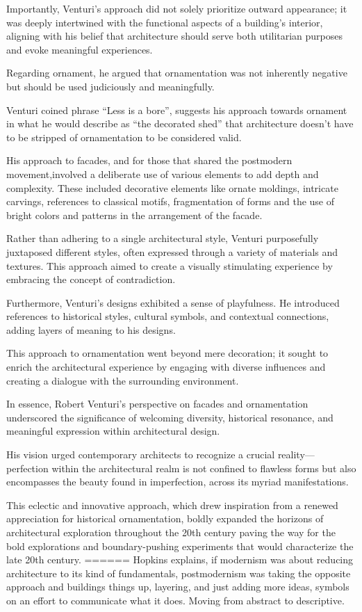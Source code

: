 Importantly, Venturi's approach did not solely prioritize outward appearance;
it was deeply intertwined with the functional aspects of a building's interior, aligning with his belief that architecture should serve both utilitarian purposes and evoke meaningful experiences.

Regarding ornament, he argued that ornamentation was not inherently negative but should be used judiciously and meaningfully.

Venturi coined phrase ``Less is a bore'', suggests his approach towards ornament in what he would describe as ``the decorated shed''\cite{Venturi1972} that architecture doesn't have to be stripped of ornamentation to be considered valid.

His approach to facades, and for those that shared the postmodern movement,involved a deliberate use of various elements to add depth and complexity.
These included decorative elements like ornate moldings, intricate carvings, references to classical motifs, fragmentation of forms and the use of bright colors and patterns in the arrangement of the facade\cite{McLaughlin2023}.

Rather than adhering to a single architectural style, Venturi purposefully juxtaposed different styles, often expressed through a variety of materials and textures.
This approach aimed to create a visually stimulating experience by embracing the concept of contradiction.

Furthermore, Venturi's designs exhibited a sense of playfulness.
He introduced references to historical styles, cultural symbols, and contextual connections, adding layers of meaning to his designs.

This approach to ornamentation went beyond mere decoration;
it sought to enrich the architectural experience by engaging with diverse influences and creating a dialogue with the surrounding environment.

In essence, Robert Venturi's perspective on facades and ornamentation underscored the significance of welcoming diversity, historical resonance, and meaningful expression within architectural design.

His vision urged contemporary architects to recognize a crucial reality—perfection within the architectural realm is not confined to flawless forms but also encompasses the beauty found in imperfection, across its myriad manifestations\cite{Lutolli2020}.

This eclectic and innovative approach, which drew inspiration from a renewed appreciation for historical ornamentation, boldly expanded the horizons of architectural exploration throughout the 20th century\cite{Stamp2016} paving the way for the bold explorations and boundary-pushing experiments that would characterize the late 20th century.
======
Hopkins explains\cite{Hopkins2020}, if modernism was about reducing architecture to its kind of fundamentals, postmodernism was taking the opposite approach and buildings things up, layering, and just adding more ideas, symbols on an effort to communicate what it does. Moving from abstract to descriptive.

